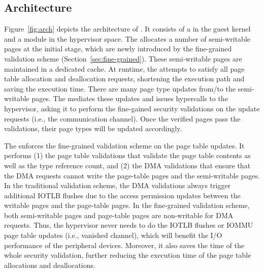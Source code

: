 \subsection{\name Architecture}
Figure~\ref{fig:arch} depicts the architecture of \name. It consists of a \cache in the guest kernel and a \name module in the hypervisor space.
The \cache allocates a number of semi-writable pages at the initial stage,  which are newly introduced by the fine-grained validation scheme (Section~\ref{sec:fine-grained}).
These semi-writable pages are maintained in a dedicated cache.
At runtime, the \cache attempts to satisfy all page table allocation and deallocation requests, shortening the execution path and saving the execution time.
There are many page type updates from/to the semi-writable pages.
The \cache mediates these updates and issues hypercalls to the hypervisor, asking it to perform the fine-gained security validations on the update requests (i.e., the communication channel).
Once the verified pages pass the validations, their page types will be updated accordingly.

The \module enforces the fine-grained validation scheme on the page table updates.
It performs (1) the page table validations that validate the page table contents as well as the type reference count, and (2) the DMA validations that ensure that the DMA requests cannot write the page-table pages and the semi-writable pages.
In the traditional validation scheme, the DMA validations always trigger additional IOTLB flushes due to the access permission updates between the writable pages and the page-table pages.
In the fine-grained validation scheme, both semi-writable pages and page-table pages are non-writable for DMA requests.
Thus, the hypervisor never needs to do the IOTLB flushes or IOMMU page table updates (i.e., vanished channel), which will benefit the I/O performance of the peripheral devices.
Moreover, it also saves the time of the whole security validation, further reducing the execution time of the page table allocations and deallocations.

